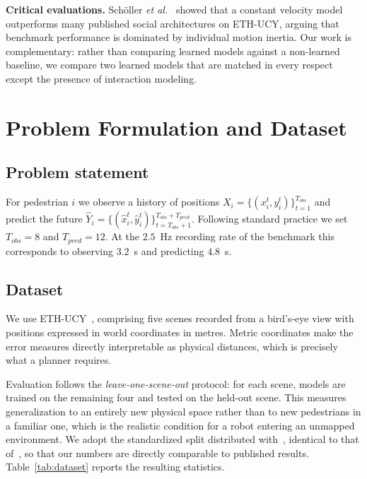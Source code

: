 \documentclass[conference]{IEEEtran}
\begin{document}
\textbf{Critical evaluations.} Schöller \textit{et al.}~\cite{scholler2020constant} showed
that a constant velocity model outperforms many published social architectures on ETH-UCY,
arguing that benchmark performance is dominated by individual motion inertia. Our work is
complementary: rather than comparing learned models against a non-learned baseline, we
compare two learned models that are matched in every respect except the presence of
interaction modeling.

\section{Problem Formulation and Dataset}

\subsection{Problem statement}

For pedestrian $i$ we observe a history of positions
$X_i = \{(x_i^t, y_i^t)\}_{t=1}^{T_{obs}}$ and predict the future
$\hat{Y}_i = \{(\hat{x}_i^t, \hat{y}_i^t)\}_{t=T_{obs}+1}^{T_{obs}+T_{pred}}$.
Following standard practice we set $T_{obs} = 8$ and $T_{pred} = 12$. At the $2.5$~Hz
recording rate of the benchmark this corresponds to observing $3.2$~s and predicting
$4.8$~s.

\subsection{Dataset}

We use ETH-UCY~\cite{pellegrini2009you,lerner2007crowds}, comprising five scenes recorded
from a bird's-eye view with positions expressed in world coordinates in metres. Metric
coordinates make the error measures directly interpretable as physical distances, which is
precisely what a planner requires.

Evaluation follows the \emph{leave-one-scene-out} protocol: for each scene, models are
trained on the remaining four and tested on the held-out scene. This measures
generalization to an entirely new physical space rather than to new pedestrians in a
familiar one, which is the realistic condition for a robot entering an unmapped environment. We
adopt the standardized split distributed with~\cite{mohamed2020social}, identical to that
of~\cite{gupta2018social}, so that our numbers are directly comparable to published
results. Table~\ref{tab:dataset} reports the resulting statistics.
\end{document}
